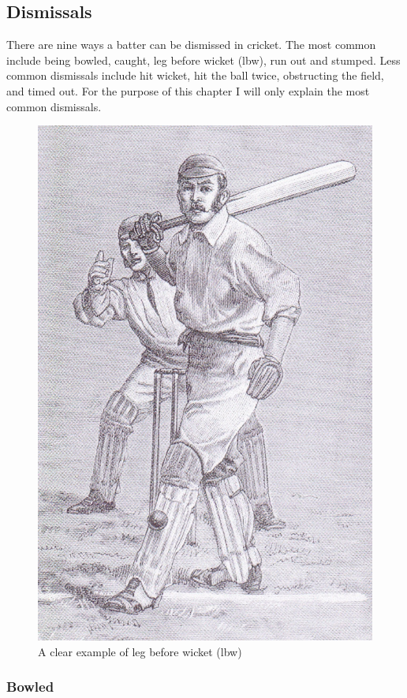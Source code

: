 \documentclass[12pt,a4paper]{report}
\theoremstyle{definition}
\begin{document}
\subsection{Dismissals} \label{sec:Dismissals}

There are nine ways a batter can be dismissed in cricket. 
The most common include being bowled, caught, leg before wicket (lbw), run out and stumped. 
Less common dismissals include hit wicket, hit the ball twice, obstructing the field, and timed out. 
For the purpose of this chapter I will only explain the most common dismissals. 

\begin{figure}[H]
    \centering
    \includegraphics[width=0.8\linewidth]{Leg_before_wicket.jpg}
    \caption{A clear example of leg before wicket (lbw) \citep{lbwWiki}}
    \label{fig:lbw}
\end{figure}

\subsubsection{Bowled}
\end{document}
